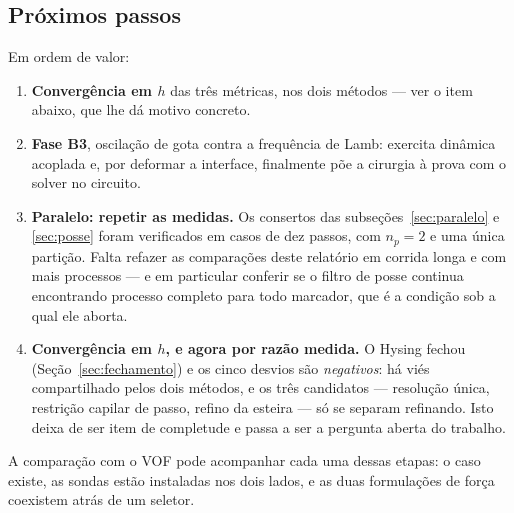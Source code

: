 \subsection{Pr\'oximos passos}

Em ordem de valor:

\begin{enumerate}
  \item \textbf{Converg\^encia em $h$} das tr\^es m\'etricas, nos dois m\'etodos ---
    ver o item abaixo, que lhe d\'a motivo concreto.
  \item \textbf{Fase B3}, oscila\c{c}\~ao de gota contra a frequ\^encia de Lamb:
    exercita din\^amica acoplada e, por deformar a interface, finalmente p\~oe a
    cirurgia \`a prova com o solver no circuito.
  \item \textbf{Paralelo: repetir as medidas.} Os consertos das
    subse\c{c}\~oes~\ref{sec:paralelo} e \ref{sec:posse} foram verificados em
    casos de dez passos, com $n_p=2$ e uma \'unica parti\c{c}\~ao. Falta refazer
    as compara\c{c}\~oes deste relat\'orio em corrida longa e com mais
    processos --- e em particular conferir se o filtro de posse continua
    encontrando processo completo para todo marcador, que \'e a condi\c{c}\~ao
    sob a qual ele aborta.
  \item \textbf{Converg\^encia em $h$, e agora por raz\~ao medida.} O Hysing
    fechou (Se\c{c}\~ao~\ref{sec:fechamento}) e os cinco desvios s\~ao
    \emph{negativos}: h\'a vi\'es compartilhado pelos dois m\'etodos, e os tr\^es
    candidatos --- resolu\c{c}\~ao \'unica, restri\c{c}\~ao capilar de passo,
    refino da esteira --- s\'o se separam refinando. Isto deixa de ser item de
    completude e passa a ser a pergunta aberta do trabalho.
\end{enumerate}

A compara\c{c}\~ao com o VOF pode acompanhar cada uma dessas etapas: o caso
existe, as sondas est\~ao instaladas nos dois lados, e as duas formula\c{c}\~oes
de for\c{c}a coexistem atr\'as de um seletor.
